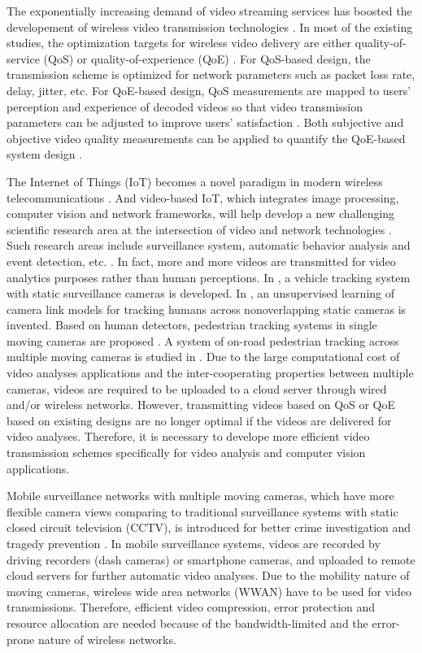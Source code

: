 \documentclass[journal]{IEEEtran}
\begin{document}
The exponentially increasing demand of video streaming services has boosted the developement of wireless video transmission technologies \cite{Hwan09}. In most of the existing studies, the optimization targets for wireless video delivery are either quality-of-service (QoS) \cite{Hwan09,EhHa12,KPKG15} or quality-of-experience (QoE) \cite{CHLC15,CHWL14,CDHR15,SHJE13,YaFA15}. For QoS-based design, the transmission scheme is optimized for network parameters such as packet loss rate, delay, jitter, etc. For QoE-based design, QoS measurements are mapped to users' perception and experience of decoded videos so that video transmission parameters can be adjusted to improve users' satisfaction \cite{FiHT10}. Both subjective and objective video quality measurements can be applied to quantify the QoE-based system design \cite{MSSB10}.

The Internet of Things (IoT) becomes a novel paradigm in modern wireless telecommunications \cite{AtIM10}. And video-based IoT, which integrates image processing, computer vision and network frameworks, will help develop a new challenging scientific research area at the intersection of video and network technologies \cite{GBMP13}. Such research areas include surveillance system, automatic behavior analysis and event detection, etc. \cite{GBMP13}. In fact, more and more videos are transmitted for video analytics purposes rather than human perceptions. In \cite{LeHC15}, a vehicle tracking system with static surveillance cameras is developed. In \cite{ChHw14}, an unsupervised learning of camera link models for tracking humans across nonoverlapping static cameras is invented. Based on human detectors, pedestrian tracking systems in single moving cameras are proposed \cite{LHOP14,HWLH15}. A system of on-road pedestrian tracking across multiple moving cameras is studied in \cite{LeHw15}. Due to the large computational cost of video analyses applications and the inter-cooperating properties between multiple cameras, videos are required to be uploaded to a cloud server through wired and/or wireless networks. However, transmitting videos based on QoS or QoE based on existing designs are no longer optimal if the videos are delivered for video analyses. Therefore, it is necessary to develope more efficient video transmission schemes specifically for video analysis and computer vision applications. 

Mobile surveillance networks with multiple moving cameras, which have more flexible camera views comparing to traditional surveillance systems with static closed circuit television (CCTV), is introduced for better crime investigation and tragedy prevention \cite{LeHw15}. In mobile surveillance systems, videos are recorded by driving recorders (dash cameras) or smartphone cameras, and uploaded to remote cloud servers for further automatic video analyses. Due to the mobility nature of moving cameras, wireless wide area networks (WWAN) have to be used for video transmissions. Therefore, efficient video compression, error protection and resource allocation are needed because of the bandwidth-limited and the error-prone nature of wireless networks. 
\end{document}
